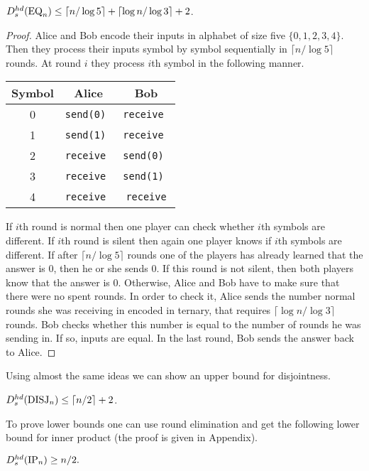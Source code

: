 \begin{theorem}
$D^{hd}_s(\mathrm{EQ}_n) \le \lceil n/\log 5\rceil + \lceil \log n / \log 3 \rceil + 2$.
\end{theorem}
\begin{proof}
Alice and Bob encode their inputs in alphabet of size five $\{0,1,2,3,4\}$. 
Then they process their inputs symbol by symbol sequentially in $\lceil n/\log 5\rceil$ rounds. 
At round $i$ they process $i$th symbol in the following manner.
\begin{center}
\begin{tabular}{c|c|c}
\bf Symbol & \bf Alice & \bf Bob \\\hline 
0 & \tt send(0)   & \tt receive  \\\hline
1 & \tt send(1)   & \tt receive  \\\hline
2 & \tt receive   & \tt send(0)  \\\hline
3 & \tt receive   & \tt send(1)  \\\hline
4 & \tt receive   & \tt receive
\end{tabular}
\end{center}
If $i$th round is normal then one player can check whether $i$th symbols are different.
If $i$th round is silent then again one player knows if $i$th symbols are different.
If after $\lceil n/\log 5\rceil$ rounds one of the players has already learned that the answer is $0$,
then he or she sends $0$. If this round is not silent, then both players know that the answer is $0$.
Otherwise, Alice and Bob have to make sure that there were no spent rounds.
In order to check it, Alice sends the number normal rounds 
she was receiving in encoded in ternary, that requires $\lceil \log n / \log 3 \rceil$ rounds.
Bob checks whether this number is equal to the number of rounds he was sending in. If so, inputs are equal.
In the last round, Bob sends the answer back to Alice.
\end{proof}
Using almost the same ideas we can show an upper bound for disjointness.
\begin{theorem}\label{thm:hds-disj}
$D^{hd}_s (\mathrm{DISJ}_n) \le \lceil n/2\rceil + 2$.
\end{theorem}

To prove lower bounds one can use round elimination and get the following lower bound for inner product (the proof is given in Appendix).

\begin{theorem}\label{thm:hds-ip}
$D^{hd}_s(\mathrm{IP}_n)\ge n/2.$
\end{theorem}

